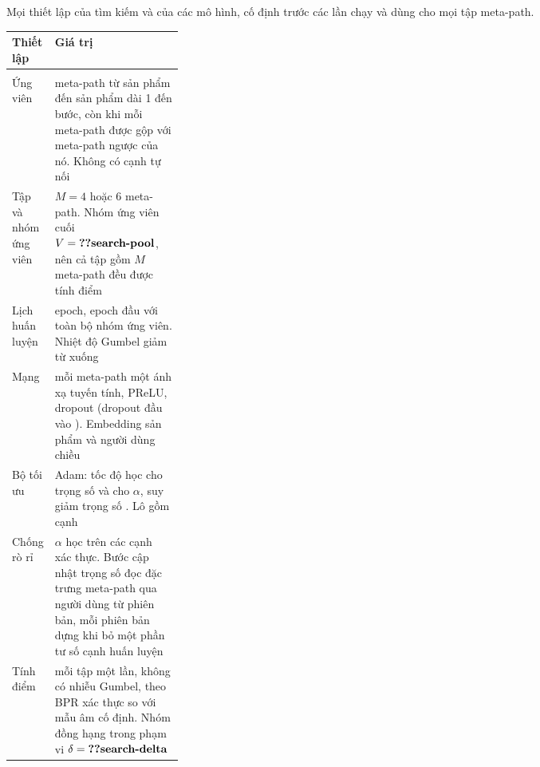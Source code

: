 \begin{widetable}[htbp]
  \centering
  \footnotesize
  \renewcommand{\arraystretch}{1.0}
  \caption{Mọi thiết lập của tìm kiếm và của các mô hình, cố định trước các lần chạy và dùng cho
    mọi tập meta-path.}
  \label{tab:settings}
  \begin{tabularx}{\linewidth}{@{}>{\raggedright\arraybackslash}p{0.25\linewidth}L@{}}
    \toprule
    Thiết lập & Giá trị \\
    \midrule
     \\
    Ứng viên &  meta-path từ sản phẩm đến sản phẩm dài 1 đến 
      bước, còn  khi mỗi meta-path được gộp với meta-path ngược của nó. Không có
      cạnh tự nối \\
    Tập và nhóm ứng viên & $M = 4$ hoặc 6 meta-path. Nhóm ứng viên cuối $V = \val{search-pool}$,
      nên cả  tập gồm $M$ meta-path đều được tính điểm \\
    Lịch huấn luyện &  epoch,  epoch đầu với toàn bộ nhóm
      ứng viên. Nhiệt độ Gumbel giảm từ  xuống  \\
    Mạng & mỗi meta-path một ánh xạ tuyến tính, PReLU, dropout  (dropout đầu
      vào ). Embedding sản phẩm và người dùng  chiều \\
    Bộ tối ưu & Adam: tốc độ học  cho trọng số và  cho $\alpha$,
      suy giảm trọng số . Lô gồm  cạnh \\
    Chống rò rỉ & $\alpha$ học trên các cạnh xác thực. Bước cập nhật trọng số đọc đặc trưng meta-path qua người dùng từ  phiên bản, mỗi phiên bản dựng khi bỏ một phần tư số
      cạnh huấn luyện \\
    Tính điểm & mỗi tập một lần, không có nhiễu Gumbel, theo BPR xác thực so với
       mẫu âm cố định. Nhóm đồng hạng trong phạm vi
      $\delta = \val{search-delta}$ \\

\end{tabularx}
\end{widetable}
